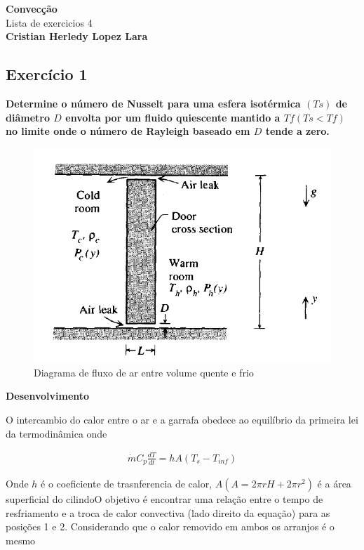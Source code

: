 \documentclass[12pt]{article}
\title{}
\author{}
\begin{document}
\begin{center}
	{\tiny {\normalsize {\large \textbf{Convecção}\\ Lista de exercicios 4\\
	
	\textbf{Cristian Herledy Lopez Lara}}}}
\end{center}

\subsection*{Exercício 1}


\textbf{Determine o número de Nusselt para uma esfera isotérmica $(Ts)$ de diâmetro $D$ envolta por um fluido quiescente mantido a $Tf (Ts < Tf)$ no limite onde o número de Rayleigh baseado em $D$ tende a zero.}\\

\begin{figure}[H]
	\centering
	\includegraphics[width=.65\textwidth]{Figures/1_1}
	\caption{Diagrama de fluxo de ar entre volume quente e frio}
\end{figure}


\textbf{Desenvolvimento} 

O intercambio do calor entre o ar e a garrafa obedece ao equilíbrio da primeira lei da termodinâmica onde

\begin{equation}
	\begin{aligned}
		\dot{m} C_{p} \frac{dT}{dt} = hA(T_{s}-T_{inf})
	\end{aligned}
\end{equation}

Onde $h$ é o coeficiente de trasnferencia de calor, $A  (A= 2\pi rH + 2\pi r^{2})$ é a área superficial do cilindoO objetivo é encontrar uma relação entre o tempo de resfriamento e a troca de calor convectiva (lado direito da equação) para as posições 1 e 2. Considerando que o calor removido em ambos os arranjos é o mesmo
\end{document}
